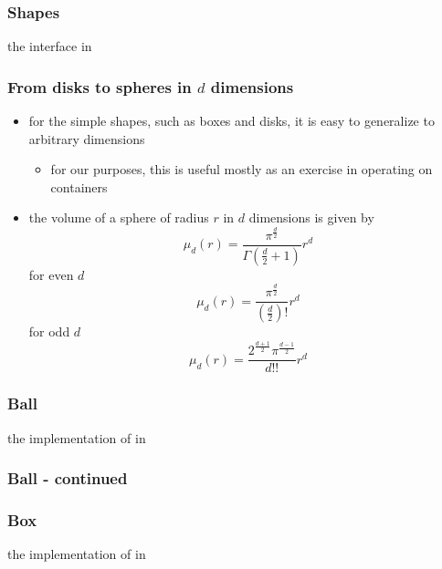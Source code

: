 \begin{frame}[fragile]
%
  \frametitle{Shapes}
%
  the  interface in 
%
%
\end{frame}

\begin{frame}[fragile]
%
  \frametitle{From disks to spheres in $d$ dimensions}
%
  \begin{itemize}
%
  \item for the simple shapes, such as boxes and disks, it is easy to generalize to arbitrary
    dimensions
    \begin{itemize}
    \item for our purposes, this is useful mostly as an exercise in operating on containers
    \end{itemize}
%
  \item the volume of a sphere of radius $r$ in $d$ dimensions is given by
%
    \[
    \mu_{d}(r) = \frac{\pi^{\frac{d}{2}}}{\Gamma\left(\frac{d}{2} + 1\right)} r^{d}
    \]
%
    for even $d$
    \[
    \mu_{d}(r) = \frac{\pi^{\frac{d}{2}}}{\left(\frac{d}{2}\right)!} r^{d}
    \]
%
    for odd $d$
    \[
    \mu_{d}(r) = \frac{2^{\frac{d+1}{2}} \pi^{\frac{d-1}{2}}}{d!!} r^{d}
    \]
%
  \end{itemize}
%
\end{frame}

\begin{frame}[fragile]
%
  \frametitle{Ball}
%
  the implementation of  in 
%
%
\end{frame}

\begin{frame}[fragile]
%
  \frametitle{Ball - continued}
%
%
\end{frame}

\begin{frame}[fragile]
%
  \frametitle{Box}
%
  the implementation of  in 
%
%
\end{frame}


